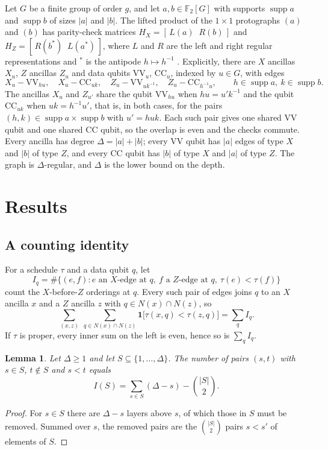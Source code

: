\documentclass[11pt,a4paper]{article}
\newtheorem{lemma}[theorem]{Lemma}
\theoremstyle{definition}
\theoremstyle{plain}
\newcommand{\F}{\mathbb{F}_2}
\newcommand{\supp}{\operatorname{supp}}
\newcommand{\one}{\mathbf{1}}
\newcommand{\VV}{\mathrm{VV}}
\newcommand{\CC}{\mathrm{CC}}
\begin{document}
Let $G$ be a finite group of order $g$, and let $a,b\in\F[G]$ with supports
$\supp a$ and $\supp b$ of sizes $\lvert a\rvert$ and $\lvert b\rvert$. The lifted
product of the $1\times1$ protographs $(a)$ and $(b)$ has parity-check
matrices $H_X=[\,L(a)\;\;R(b)\,]$ and $H_Z=[\,R(b^*)\;\;L(a^*)\,]$, where $L$
and $R$ are the left and right regular representations and $^*$ is the
antipode $h\mapsto h^{-1}$ \cite{NRB2026}. Explicitly, there are $X$ ancillas
$X_u$, $Z$ ancillas $Z_u$ and data qubits $\VV_u$, $\CC_u$, indexed by $u\in G$,
with edges
\begin{equation}\label{eq:edges}
X_u - \VV_{hu},\quad X_u - \CC_{uk},\quad
Z_u - \VV_{uk^{-1}},\quad Z_u - \CC_{h^{-1}u},
\qquad h\in\supp a,\ k\in\supp b .
\end{equation}
The ancillas $X_u$ and $Z_{u'}$ share the qubit $\VV_{hu}$ when $hu=u'k^{-1}$
and the qubit $\CC_{uk}$ when $uk=h^{-1}u'$, that is, in both cases, for the
pairs $(h,k)\in\supp a\times\supp b$ with $u'=huk$. Each such pair gives one
shared $\VV$ qubit and one shared $\CC$ qubit, so the overlap is even and the
checks commute. Every ancilla has
degree $\Delta=\lvert a\rvert+\lvert b\rvert$; every $\VV$ qubit has
$\lvert a\rvert$ edges of type $X$ and $\lvert b\rvert$ of type $Z$, and every
$\CC$ qubit has $\lvert b\rvert$ of type $X$ and $\lvert a\rvert$ of type $Z$.
The graph is $\Delta$-regular, and $\Delta$ is the lower bound on the depth.

\section{Results}\label{sec:results}
\subsection{A counting identity}
For a schedule $\tau$ and a data qubit $q$, let
\[
I_q=\#\bigl\{(e,f): e\text{ an }X\text{-edge at }q,\ f\text{ a }Z\text{-edge at }q,\ \tau(e)<\tau(f)\bigr\}
\]
count the $X$-before-$Z$ orderings at $q$. Every such pair of edges joins $q$
to an $X$ ancilla $x$ and a $Z$ ancilla $z$ with $q\in N(x)\cap N(z)$, so
\begin{equation}\label{eq:doublecount}
\sum_{(x,z)}\ \sum_{q\in N(x)\cap N(z)}\one\bigl[\tau(x,q)<\tau(z,q)\bigr]
=\sum_q I_q .
\end{equation}
If $\tau$ is proper, every inner sum on the left is even, hence so is
$\sum_qI_q$.

\begin{lemma}\label{lem:count}
Let $\Delta\ge1$ and let $S\subseteq\{1,\dots,\Delta\}$. The number of pairs
$(s,t)$ with $s\in S$, $t\notin S$ and $s<t$ equals
\[
I(S)=\sum_{s\in S}(\Delta-s)-\binom{\lvert S\rvert}{2}.
\]
\end{lemma}
\begin{proof}
For $s\in S$ there are $\Delta-s$ layers above $s$, of which those in $S$ must
be removed. Summed over $s$, the removed pairs are the $\binom{\lvert S\rvert}{2}$
pairs $s<s'$ of elements of $S$.
\end{proof}
\end{document}
